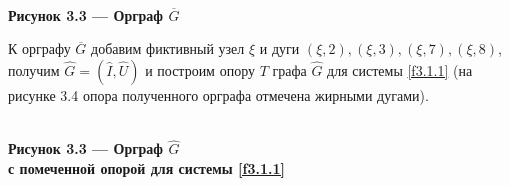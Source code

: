 \documentclass[14pt]{extarticle}%
\begin{document}
\begin{center}
\\
\textbf{Рисунок 3.3 --- Орграф $\overline{G}$}
\end{center}

К орграфу $\overline{G}$ добавим фиктивный узел $\xi$ и дуги $(\xi, 2),(\xi,3),(\xi,7), (\xi,8)$, получим $\widehat{G}=(\widehat{I},\widehat{U})$ и построим опору $T$ графа $\widehat{G}$ для системы \eqref{f3.1.1} (на рисунке 3.4 опора полученного орграфа отмечена жирными дугами). 

\begin{center}
\\
\textbf{Рисунок 3.3 --- Орграф $\widehat{G}$ \\с помеченной опорой для системы \eqref{f3.1.1}}
\end{center}
\end{document}

